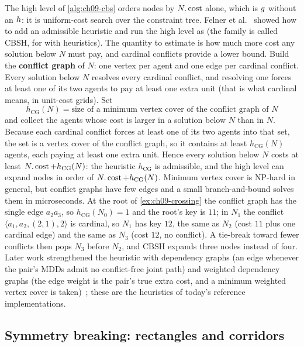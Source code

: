 The high level of \cref{alg:ch09-cbs} orders nodes by $N.\operatorname{cost}$ alone,
which is $g$ without an $h$: it is uniform-cost search over the
constraint tree. Felner et al.~\cite{felner2018adding} showed how to add an
admissible heuristic and run the high level as \astar (the family is called
CBSH, for \cbs with heuristics). The quantity to estimate
is how much more cost any solution below $N$ must pay, and cardinal
conflicts provide a lower bound. Build the \textbf{conflict graph} of $N$:
one vertex per agent and one edge per cardinal conflict. Every solution
below $N$ resolves every cardinal conflict, and resolving one forces at
least one of its two agents to pay at least one extra unit (that is what
cardinal means, in unit-cost grids). Set
\begin{equation}
\label{eq:ch09-hcg}
h_{\mathrm{CG}}(N) = \text{size of a minimum vertex cover of the conflict graph of } N
\end{equation}
and collect the agents whose cost is larger in a solution below $N$ than in
$N$. Because each cardinal conflict forces at least one of its two agents
into that set, the set is a vertex cover of the conflict graph, so it
contains at least $h_{\mathrm{CG}}(N)$ agents, each paying at least one
extra unit. Hence every solution below $N$ costs at least
$N.\operatorname{cost} + h_{\mathrm{CG}}(N)$: the heuristic $h_{\mathrm{CG}}$ is
admissible, and the high level can expand nodes in order of
$N.\operatorname{cost} + h_{\mathrm{CG}}(N)$. Minimum vertex cover is NP-hard in general,
but conflict graphs have few edges and a small branch-and-bound solves them
in microseconds. At the root of \cref{ex:ch09-crossing} the conflict graph
has the single edge $a_2 a_3$, so $h_{\mathrm{CG}}(N_0) = 1$ and the root's
key is $11$; in $N_1$ the conflict $\langle a_1, a_2, (2,1), 2\rangle$ is
cardinal, so $N_1$ has key $12$, the same as $N_2$ (cost $11$ plus one
cardinal edge) and the same as $N_3$ (cost $12$, no conflict). A tie-break
toward fewer conflicts then pops $N_3$ before $N_2$, and CBSH expands three
nodes instead of four. Later work strengthened the heuristic with
dependency graphs (an edge whenever the pair's MDDs admit no conflict-free
joint path) and weighted dependency graphs (the edge weight is the pair's
true extra cost, and a minimum weighted vertex cover is
taken)~\cite{li2019improved}; these are the heuristics of today's
reference implementations.

\subsection{Symmetry breaking: rectangles and corridors}
\label{sec:ch09-symmetry}


